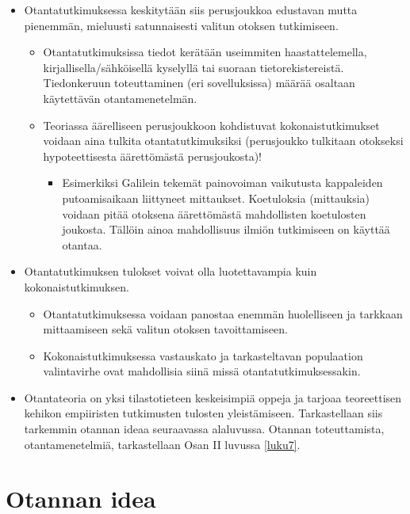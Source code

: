 \documentclass[
]{book}
\providecommand{\tightlist}{%
  \setlength{\itemsep}{0pt}\setlength{\parskip}{0pt}}
\begin{document}
\begin{itemize}
\tightlist
\item
  Otantatutkimuksessa keskitytään siis perusjoukkoa edustavan mutta pienemmän, mieluusti satunnaisesti valitun otoksen tutkimiseen.

  \begin{itemize}
  \tightlist
  \item
    Otantatutkimuksissa tiedot kerätään useimmiten haastattelemella, kirjallisella/sähköisellä kyselyllä tai suoraan tietorekistereistä. Tiedonkeruun toteuttaminen (eri sovelluksissa) määrää osaltaan käytettävän otantamenetelmän.
  \item
    Teoriassa äärelliseen perusjoukkoon kohdistuvat kokonaistutkimukset voidaan aina tulkita otantatutkimuksiksi (perusjoukko tulkitaan otokseksi hypoteettisesta äärettömästä perusjoukosta)!

    \begin{itemize}
    \tightlist
    \item
      Esimerkiksi Galilein tekemät painovoiman vaikutusta kappaleiden putoamisaikaan liittyneet mittaukset. Koetuloksia (mittauksia) voidaan pitää otoksena äärettömästä mahdollisten koetulosten joukosta. Tällöin ainoa mahdollisuus ilmiön tutkimiseen on käyttää otantaa.
    \end{itemize}
  \end{itemize}
\item
  Otantatutkimuksen tulokset voivat olla luotettavampia kuin kokonaistutkimuksen.

  \begin{itemize}
  \tightlist
  \item
    Otantatutkimuksessa voidaan panostaa enemmän huolelliseen ja tarkkaan mittaamiseen sekä valitun otoksen tavoittamiseen.
  \item
    Kokonaistutkimuksessa vastauskato ja tarkasteltavan populaation valintavirhe ovat mahdollisia siinä missä otantatutkimuksessakin.
  \end{itemize}
\item
  Otantateoria on yksi tilastotieteen keskeisimpiä oppeja ja tarjoaa teoreettisen kehikon empiiristen tutkimusten tulosten yleistämiseen. Tarkastellaan siis tarkemmin otannan ideaa seuraavassa alaluvussa. Otannan toteuttamista, otantamenetelmiä, tarkastellaan Osan II luvussa \ref{luku7}.
\end{itemize}

\hypertarget{alaluku52}{%
\section{Otannan idea}\label{alaluku52}}
\end{document}
